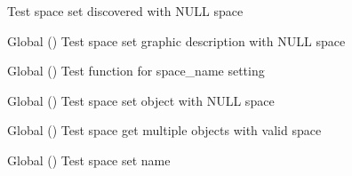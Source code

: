 \begin{DoxyRefList}
%
Test space set discovered with NULL space  
\item[Global \doxylink{space__test_8c_af40c7a664b529a39c3d98dca3d0af708}{test2\+\_\+space\+\_\+set\+\_\+gdesc} ()]\label{test__test000171}%
%
Test space set graphic description with NULL space  
\item[Global \doxylink{space__test_8c_a5a868ba017602ba6b58447cb394e81a6}{test2\+\_\+space\+\_\+set\+\_\+name} ()]\label{test__test000157}%
%
Test function for space\+\_\+name setting  
\item[Global \doxylink{space__test_8c_a6349e2b547c71dee23b96d8bbf7a1806}{test2\+\_\+space\+\_\+set\+\_\+object} ()]\label{test__test000160}%
%
Test space set object with NULL space  
\item[Global \doxylink{space__test_8c_a3fb76d2dce3ed1a0ce85228e2f7d1cab}{test3\+\_\+space\+\_\+multiple\+\_\+objects} ()]\label{test__test000169}%
%
Test space get multiple objects with valid space  
\item[Global \doxylink{space__test_8c_aa24a337830006e33706ab6ac1c416b47}{test3\+\_\+space\+\_\+set\+\_\+name} ()]\label{test__test000158}%
%
Test space set name 
\end{DoxyRefList}